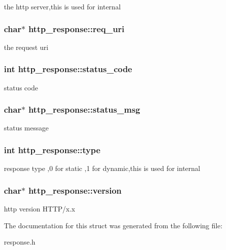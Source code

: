 \label{structhttp__response_a762a56e397857a5f649ad151474daad5}
the http server,this is used for internal \hypertarget{structhttp__response_a6eda538dab467a94b48813a6ea424e62}{
\subsubsection[{req\_\-uri}]{\setlength{\rightskip}{0pt plus 5cm}char$\ast$ {\bf http\_\-response::req\_\-uri}}}
\label{structhttp__response_a6eda538dab467a94b48813a6ea424e62}
the request uri \hypertarget{structhttp__response_a2832d0ec07aa88fbf6e4136014bae003}{
\subsubsection[{status\_\-code}]{\setlength{\rightskip}{0pt plus 5cm}int {\bf http\_\-response::status\_\-code}}}
\label{structhttp__response_a2832d0ec07aa88fbf6e4136014bae003}
status code \hypertarget{structhttp__response_a7ba51c31f4fa16f868bbfb2448d1b061}{
\subsubsection[{status\_\-msg}]{\setlength{\rightskip}{0pt plus 5cm}char$\ast$ {\bf http\_\-response::status\_\-msg}}}
\label{structhttp__response_a7ba51c31f4fa16f868bbfb2448d1b061}
status message \hypertarget{structhttp__response_abab20709a27b924ae24eb6e6b03561cc}{
\subsubsection[{type}]{\setlength{\rightskip}{0pt plus 5cm}int {\bf http\_\-response::type}}}
\label{structhttp__response_abab20709a27b924ae24eb6e6b03561cc}
response type ,0 for static ,1 for dynamic,this is used for internal \hypertarget{structhttp__response_a598a52db98b15ced51745423dca1a61a}{
\subsubsection[{version}]{\setlength{\rightskip}{0pt plus 5cm}char$\ast$ {\bf http\_\-response::version}}}
\label{structhttp__response_a598a52db98b15ced51745423dca1a61a}
http version HTTP/x.x 

The documentation for this struct was generated from the following file:\begin{DoxyCompactItemize}
\item 
response.h\end{DoxyCompactItemize}
